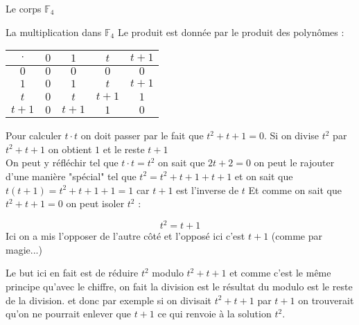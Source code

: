 \begin{parag}{Le corps $\mathbb{F}_4$}
\begin{subparag}{La multiplication dans $\mathbb{F}_4$}
        Le produit est donnée par le produit des polynômes :\\
                \begin{tabular}{|c||c|c|c|c|}
        \hline
            $\cdot$ & $0$ & $1$ & $t$ & $t+1$  \\
            \hline
            \hline
            $0$ & $0$ & $0$ & $0$ & $0$ \\
            \hline
            $1$ & $0$ & $1$ & $t$ & $t+1$ \\
            \hline
            $t$ & $0$ & $t$ & $t+1$ & $1$ \\
            \hline
            $t+1$ & $0$ & $t+1$ & $1$ & $0$ \\
            \hline
        \end{tabular}
        Pour calculer $t\cdot t$ on doit passer par le fait que $t^2 + t + 1 = 0$. Si on divise $t^2$ par $t^2 + t +1$ on obtient $1$ et le reste $t+1$
        \\
        On peut y réfléchir tel que $t\cdot t = t^2$ on sait que $2t + 2 = 0$ on peut le rajouter d'une manière "spécial" tel que $t^2 = t^2 + t + 1 + t + 1$ et on sait que $t(t+1) = t^2 + t + 1 + 1 = 1$ car $t+1$ est l'inverse de $t$ Et comme on sait que $t^2 + t + 1 = 0$ on peut isoler $t^2$ : 
        
        \[t^2 = t + 1\]
        Ici on a mis l'opposer de l'autre côté et l'opposé ici c'est $t+1$ (comme par magie...)
        \begin{framedremark}
            Le but ici en fait est de réduire $t^2$ modulo $t^2 + t + 1$ et comme c'est le même principe qu'avec le chiffre, on fait la division est le résultat du modulo est le reste de la division. et donc par exemple si on divisait $t^2 + t + 1$ par $t+1$ on trouverait qu'on ne pourrait enlever que $t+1$ ce qui renvoie à la solution $t^2$.
        \end{framedremark}
    \end{subparag}
\end{parag}


